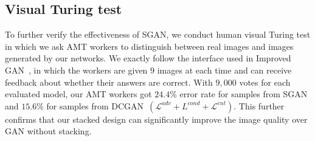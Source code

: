 \documentclass[10pt,twocolumn,letterpaper]{article}
\begin{document}
\subsection{Visual Turing test}
To further verify the effectiveness of SGAN, we conduct human visual Turing test in which we ask AMT workers to distinguish between real images and images generated by our networks. We exactly follow the interface used in Improved GAN~\cite{salimans2016improved}, in which the workers are given $9$ images at each time and can receive feedback about whether their answers are correct. With $9,000$ votes for each evaluated model, our AMT workers got $24.4\%$ error rate for samples from SGAN and $15.6\%$ for samples from DCGAN~$(\mathcal{L}^{adv}+L^{cond}+\mathcal{L}^{ent})$. This further confirms that our stacked design can significantly improve the image quality over GAN without stacking.

\end{document}
